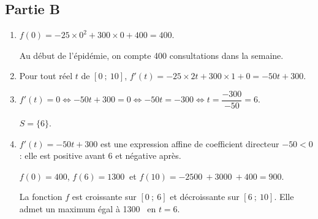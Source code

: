 \documentclass[10pt]{article}
\providecommand{\np}[2][]{{#2~#1}}
\begin{document}
\subsection*{Partie B}

\begin{enumerate}
	\item $f(0) = -25\times 0^2 + 300\times 0 + 400 = 400$.

	Au début de l'épidémie, on compte 400 consultations dans la semaine.

	\item Pour tout réel $t$ de $[0~;~10]$,
$f'(t) = -25\times 2t + 300\times 1 + 0 = -50t + 300$.

	\item $f'(t) = 0 \iff -50t + 300 = 0 \iff -50t = -300 \iff t = \dfrac{-300}{-50} = 6$.
	
$S = \{6\}$.

	\item $f'(t) = -50t + 300$ est une expression affine de coefficient directeur $-50 < 0$ : elle est
	positive avant 6 et négative après.

	$f(0) = 400$, $f(6) = \np{1300}$ et
	$f(10) = -\np{2500} + \np{3000} + 400 = 900$.

	\begin{center}
	\end{center}

	La fonction $f$ est croissante sur $[0~;~6]$ et décroissante sur $[6~;~10]$. Elle admet un
	maximum égal à \np{1300} en $t = 6$.
\end{enumerate}
\end{document}
